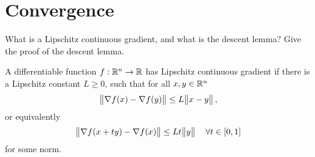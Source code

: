 \documentclass{article}
\begin{document}
\section{Convergence}

\begin{question}
  What is a Lipschitz continuous gradient, and what is the descent lemma?  Give the proof of the
  descent lemma.
\end{question}

A differentiable function \(f: \mathbb{R}^n \to \mathbb{R}\) has Lipschitz continuous gradient if there is a
Lipschitz constant \(L \geq 0\), such that for all \(x, y \in \mathbb{R}^n\)
\begin{equation*}
  \enVert{\nabla f(x) - \nabla f(y)} \leq L \enVert[1]{x - y},
\end{equation*}
or equivalently
\begin{equation*}
  \enVert{\nabla f(x + ty) - \nabla f(x)} \leq Lt \enVert[1]{y} \quad \forall t \in [0, 1]
\end{equation*}
for some norm.
\end{document}
